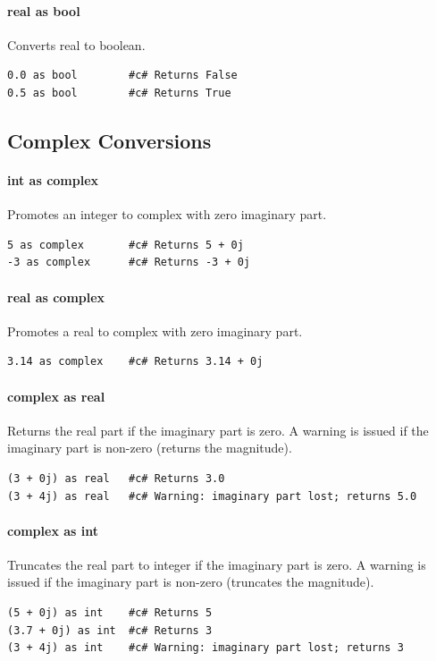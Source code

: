\paragraph{real as bool}
Converts real to boolean.
\begin{verbatim}
0.0 as bool        #c# Returns False
0.5 as bool        #c# Returns True
\end{verbatim}

\subsection{Complex Conversions}

\paragraph{int as complex}
Promotes an integer to complex with zero imaginary part.
\begin{verbatim}
5 as complex       #c# Returns 5 + 0j
-3 as complex      #c# Returns -3 + 0j
\end{verbatim}

\paragraph{real as complex}
Promotes a real to complex with zero imaginary part.
\begin{verbatim}
3.14 as complex    #c# Returns 3.14 + 0j
\end{verbatim}

\paragraph{complex as real}
Returns the real part if the imaginary part is zero. A warning is issued if the imaginary part is non-zero (returns the magnitude).
\begin{verbatim}
(3 + 0j) as real   #c# Returns 3.0
(3 + 4j) as real   #c# Warning: imaginary part lost; returns 5.0
\end{verbatim}

\paragraph{complex as int}
Truncates the real part to integer if the imaginary part is zero. A warning is issued if the imaginary part is non-zero (truncates the magnitude).
\begin{verbatim}
(5 + 0j) as int    #c# Returns 5
(3.7 + 0j) as int  #c# Returns 3
(3 + 4j) as int    #c# Warning: imaginary part lost; returns 3
\end{verbatim}

